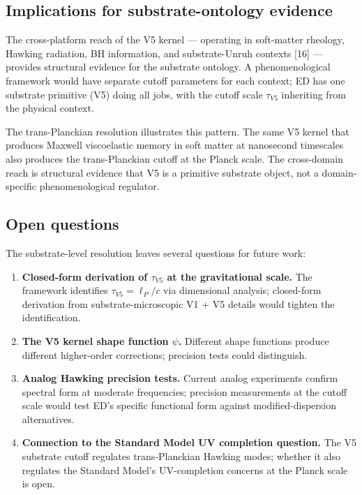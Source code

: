 \documentclass[11pt,a4paper]{article}
\begin{document}
\subsection{Implications for substrate-ontology evidence}

The cross-platform reach of the V5 kernel --- operating in soft-matter rheology, Hawking radiation, BH information, and substrate-Unruh contexts [16] --- provides structural evidence for the substrate ontology. A phenomenological framework would have separate cutoff parameters for each context; ED has one substrate primitive (V5) doing all jobs, with the cutoff scale $\tau_{V5}$ inheriting from the physical context.

The trans-Planckian resolution illustrates this pattern. The same V5 kernel that produces Maxwell viscoelastic memory in soft matter at nanosecond timescales also produces the trans-Planckian cutoff at the Planck scale. The cross-domain reach is structural evidence that V5 is a primitive substrate object, not a domain-specific phenomenological regulator.

\subsection{Open questions}

The substrate-level resolution leaves several questions for future work:

\begin{enumerate}[noitemsep]
\item \textbf{Closed-form derivation of $\tau_{V5}$ at the gravitational scale.} The framework identifies $\tau_{V5} = \ell_P/c$ via dimensional analysis; closed-form derivation from substrate-microscopic V1 + V5 details would tighten the identification.
\item \textbf{The V5 kernel shape function $\psi$.} Different shape functions produce different higher-order corrections; precision tests could distinguish.
\item \textbf{Analog Hawking precision tests.} Current analog experiments confirm spectral form at moderate frequencies; precision measurements at the cutoff scale would test ED's specific functional form against modified-dispersion alternatives.
\item \textbf{Connection to the Standard Model UV completion question.} The V5 substrate cutoff regulates trans-Planckian Hawking modes; whether it also regulates the Standard Model's UV-completion concerns at the Planck scale is open.
\end{enumerate}
\end{document}
